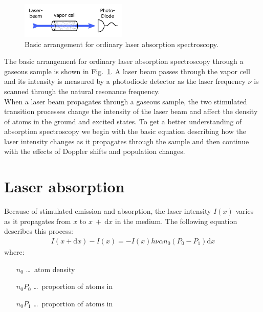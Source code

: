 \begin{figure}
    \centering
    \includegraphics[width=0.45\textwidth]{absorption_spectroscopy_theory}    
    \caption{\label{fig:absorption_spectroscopy} Basic arrangement for ordinary laser absorption spectroscopy.}
\end{figure}

The basic arrangement for ordinary laser absorption spectroscopy through a gaseous sample is shown in
Fig.~\ref{fig:absorption_spectroscopy}. A laser beam passes through the vapor cell and its intensity is measured
by a photodiode detector as the laser frequency \(\nu \) is scanned through the natural
resonance frequency. \\
When a laser beam propagates through a gaseous sample, the two stimulated transition processes change the intensity
of the laser beam and affect the density of atoms in the ground and excited states. To get a better understanding 
of absorption spectroscopy we begin with the basic equation describing how the laser intensity changes as it 
propagates through the sample and then continue with the effects of Doppler shifts and population changes. 

\section{Laser absorption} %

Because of stimulated emission and absorption, the laser intensity \(I(x) \) varies as it propagates from \(x \) to
\(x~+~\mathrm{d}x \) in the medium. The following equation describes this process:
\begin{align} \label{eq:Int}
    I(x+\mathrm{d}x)-I(x) = - I(x) h\nu \alpha n_0  (P_0-P_1) \mathrm{d}x 
\end{align}
where:

\begin{itemize}
    \setlength{\itemsep}{0ex}
    \item[\(n_0\)]\ldots~atom density 
    \item[\(n_0 P_0\)]\ldots~proportion of atoms in 
    \item[\(n_0 P_1\)]\ldots~proportion of atoms in 
\end{itemize}

